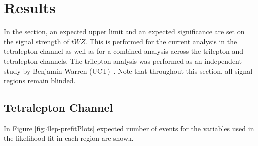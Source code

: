\section{Results}

In the section, an expected upper limit and an expected significance are set on the signal strength of $tWZ$. This is performed for the current analysis in the tetralepton channel as well as for a combined analysis across the trilepton and tetralepton channels. The trilepton analysis was performed as an independent study by Benjamin Warren (UCT)~\cite{ben-thesis}. Note that throughout this section, all signal regions remain blinded.

\subsection{Tetralepton Channel}

In Figure \ref{fig:4lep-prefitPlots} expected number of events for the variables used in the likelihood fit in each region are shown.

